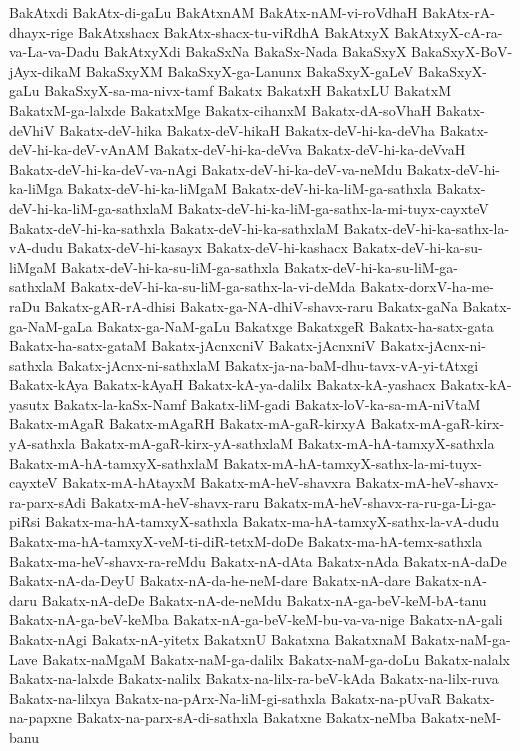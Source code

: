 {BakAtxdi
BakAtx-di-gaLu
BakAtxnAM
BakAtx-nAM-vi-roVdhaH
BakAtx-rA-dhayx-rige
BakAtxshacx
BakAtx-shacx-tu-viRdhA
BakAtxyX
BakAtxyX-cA-ra-va-La-va-Dadu
BakAtxyXdi
BakaSxNa
BakaSx-Nada
BakaSxyX
BakaSxyX-BoV-jAyx-dikaM
BakaSxyXM
BakaSxyX-ga-Lanunx
BakaSxyX-gaLeV
BakaSxyX-gaLu
BakaSxyX-sa-ma-nivx-tamf
Bakatx
BakatxH
BakatxLU
BakatxM
BakatxM-ga-lalxde
BakatxMge
Bakatx-cihanxM
Bakatx-dA-soVhaH
Bakatx-deVhiV
Bakatx-deV-hika
Bakatx-deV-hikaH
Bakatx-deV-hi-ka-deVha
Bakatx-deV-hi-ka-deV-vAnAM
Bakatx-deV-hi-ka-deVva
Bakatx-deV-hi-ka-deVvaH
Bakatx-deV-hi-ka-deV-va-nAgi
Bakatx-deV-hi-ka-deV-va-neMdu
Bakatx-deV-hi-ka-liMga
Bakatx-deV-hi-ka-liMgaM
Bakatx-deV-hi-ka-liM-ga-sathxla
Bakatx-deV-hi-ka-liM-ga-sathxlaM
Bakatx-deV-hi-ka-liM-ga-sathx-la-mi-tuyx-cayxteV
Bakatx-deV-hi-ka-sathxla
Bakatx-deV-hi-ka-sathxlaM
Bakatx-deV-hi-ka-sathx-la-vA-dudu
Bakatx-deV-hi-kasayx
Bakatx-deV-hi-kashacx
Bakatx-deV-hi-ka-su-liMgaM
Bakatx-deV-hi-ka-su-liM-ga-sathxla
Bakatx-deV-hi-ka-su-liM-ga-sathxlaM
Bakatx-deV-hi-ka-su-liM-ga-sathx-la-vi-deMda
Bakatx-dorxV-ha-me-raDu
Bakatx-gAR-rA-dhisi
Bakatx-ga-NA-dhiV-shavx-raru
Bakatx-gaNa
Bakatx-ga-NaM-gaLa
Bakatx-ga-NaM-gaLu
Bakatxge
BakatxgeR
Bakatx-ha-satx-gata
Bakatx-ha-satx-gataM
Bakatx-jAcnxcniV
Bakatx-jAcnxniV
Bakatx-jAcnx-ni-sathxla
Bakatx-jAcnx-ni-sathxlaM
Bakatx-ja-na-baM-dhu-tavx-vA-yi-tAtxgi
Bakatx-kAya
Bakatx-kAyaH
Bakatx-kA-ya-dalilx
Bakatx-kA-yashacx
Bakatx-kA-yasutx
Bakatx-la-kaSx-Namf
Bakatx-liM-gadi
Bakatx-loV-ka-sa-mA-niVtaM
Bakatx-mAgaR
Bakatx-mAgaRH
Bakatx-mA-gaR-kirxyA
Bakatx-mA-gaR-kirx-yA-sathxla
Bakatx-mA-gaR-kirx-yA-sathxlaM
Bakatx-mA-hA-tamxyX-sathxla
Bakatx-mA-hA-tamxyX-sathxlaM
Bakatx-mA-hA-tamxyX-sathx-la-mi-tuyx-cayxteV
Bakatx-mA-hAtayxM
Bakatx-mA-heV-shavxra
Bakatx-mA-heV-shavx-ra-parx-sAdi
Bakatx-mA-heV-shavx-raru
Bakatx-mA-heV-shavx-ra-ru-ga-Li-ga-piRsi
Bakatx-ma-hA-tamxyX-sathxla
Bakatx-ma-hA-tamxyX-sathx-la-vA-dudu
Bakatx-ma-hA-tamxyX-veM-ti-diR-tetxM-doDe
Bakatx-ma-hA-temx-sathxla
Bakatx-ma-heV-shavx-ra-reMdu
Bakatx-nA-dAta
Bakatx-nAda
Bakatx-nA-daDe
Bakatx-nA-da-DeyU
Bakatx-nA-da-he-neM-dare
Bakatx-nA-dare
Bakatx-nA-daru
Bakatx-nA-deDe
Bakatx-nA-de-neMdu
Bakatx-nA-ga-beV-keM-bA-tanu
Bakatx-nA-ga-beV-keMba
Bakatx-nA-ga-beV-keM-bu-va-va-nige
Bakatx-nA-gali
Bakatx-nAgi
Bakatx-nA-yitetx
BakatxnU
Bakatxna
BakatxnaM
Bakatx-naM-ga-Lave
Bakatx-naMgaM
Bakatx-naM-ga-dalilx
Bakatx-naM-ga-doLu
Bakatx-nalalx
Bakatx-na-lalxde
Bakatx-nalilx
Bakatx-na-lilx-ra-beV-kAda
Bakatx-na-lilx-ruva
Bakatx-na-lilxya
Bakatx-na-pArx-Na-liM-gi-sathxla
Bakatx-na-pUvaR
Bakatx-na-papxne
Bakatx-na-parx-sA-di-sathxla
Bakatxne
Bakatx-neMba
Bakatx-neM-banu
}
